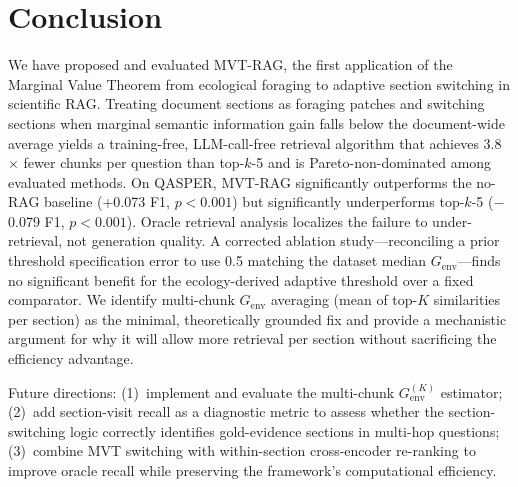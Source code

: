 \documentclass[11pt,letterpaper]{article}
\begin{document}
\section{Conclusion}

We have proposed and evaluated MVT-RAG, the first application of the Marginal Value Theorem from ecological foraging
to adaptive section switching in scientific RAG. Treating document sections as foraging patches and switching sections
when marginal semantic information gain falls below the document-wide average yields a training-free, LLM-call-free
retrieval algorithm that achieves 3.8$\times$ fewer chunks per question than top-$k$-5 and is Pareto-non-dominated
among evaluated methods. On QASPER, MVT-RAG significantly outperforms the no-RAG baseline (+0.073 F1, $p{<}0.001$)
but significantly underperforms top-$k$-5 ($-$0.079 F1, $p{<}0.001$). Oracle retrieval analysis localizes the failure
to under-retrieval, not generation quality. A corrected ablation study---reconciling a prior threshold specification
error to use 0.5 matching the dataset median $G_{\mathrm{env}}$---finds no significant benefit for the ecology-derived
adaptive threshold over a fixed comparator. We identify multi-chunk $G_{\mathrm{env}}$ averaging (mean of top-$K$
similarities per section) as the minimal, theoretically grounded fix and provide a mechanistic argument for why it
will allow more retrieval per section without sacrificing the efficiency advantage.

Future directions: (1)~implement and evaluate the multi-chunk $G_{\mathrm{env}}^{(K)}$ estimator; (2)~add
section-visit recall as a diagnostic metric to assess whether the section-switching logic correctly identifies
gold-evidence sections in multi-hop questions; (3)~combine MVT switching with within-section cross-encoder
re-ranking to improve oracle recall while preserving the framework's computational efficiency.



\end{document}
